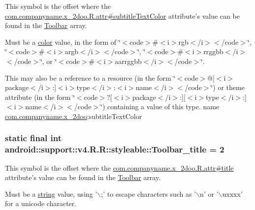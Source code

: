 This symbol is the offset where the \hyperlink{classcom_1_1companyname_1_1x__2doo_1_1_r_1_1attr_3d8f65819b4bb9a277d31175502b989f}{com.companyname.x\_\-2doo.R.attr\#subtitleTextColor} attribute's value can be found in the \hyperlink{classandroid_1_1support_1_1v4_1_1_r_1_1styleable_0646d71cfbd4a8645c7d805b33e1c574}{Toolbar} array.

Must be a \hyperlink{classandroid_1_1support_1_1v4_1_1_r_1_1color}{color} value, in the form of \char`\"{}$<$code$>$\#$<$i$>$rgb$<$/i$>$$<$/code$>$\char`\"{}, \char`\"{}$<$code$>$\#$<$i$>$argb$<$/i$>$$<$/code$>$\char`\"{}, \char`\"{}$<$code$>$\#$<$i$>$rrggbb$<$/i$>$$<$/code$>$\char`\"{}, or \char`\"{}$<$code$>$\#$<$i$>$aarrggbb$<$/i$>$$<$/code$>$\char`\"{}. 

This may also be a reference to a resource (in the form \char`\"{}$<$code$>$@\mbox{[}$<$i$>$package$<$/i$>$:\mbox{]}$<$i$>$type$<$/i$>$:$<$i$>$name$<$/i$>$$<$/code$>$\char`\"{}) or theme attribute (in the form \char`\"{}$<$code$>$?\mbox{[}$<$i$>$package$<$/i$>$:\mbox{]}\mbox{[}$<$i$>$type$<$/i$>$:\mbox{]}$<$i$>$name$<$/i$>$$<$/code$>$\char`\"{}) containing a value of this type.  name \hyperlink{namespacecom_1_1companyname_1_1x__2doo}{com.companyname.x\_\-2doo}:subtitleTextColor \hypertarget{classandroid_1_1support_1_1v4_1_1_r_1_1styleable_b046a72644d4b4e207982a1e5afea260}{
\subsubsection[{Toolbar\_\-title}]{\setlength{\rightskip}{0pt plus 5cm}static final int android::support::v4.R.R::styleable::Toolbar\_\-title = 2}}
\label{classandroid_1_1support_1_1v4_1_1_r_1_1styleable_b046a72644d4b4e207982a1e5afea260}


This symbol is the offset where the \hyperlink{classcom_1_1companyname_1_1x__2doo_1_1_r_1_1attr_d23b9d3aaa28f1e83be97e20f187059b}{com.companyname.x\_\-2doo.R.attr\#title} attribute's value can be found in the \hyperlink{classandroid_1_1support_1_1v4_1_1_r_1_1styleable_0646d71cfbd4a8645c7d805b33e1c574}{Toolbar} array.

Must be a \hyperlink{classandroid_1_1support_1_1v4_1_1_r_1_1string}{string} value, using '$\backslash$;' to escape characters such as '$\backslash$n' or '$\backslash$uxxxx' for a unicode character. 

